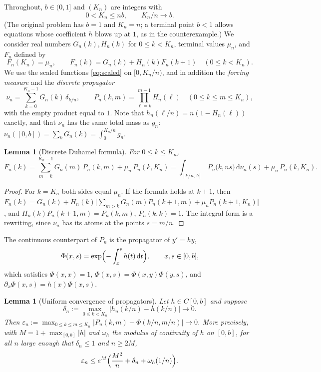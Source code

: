 \documentclass[11pt]{article}
\newtheorem{lemma}[theorem]{Lemma}
\theoremstyle{definition}
\theoremstyle{remark}
\newcommand{\dd}{\,\mathrm{d}}
\newcommand{\1}{\mathbf{1}}
\begin{document}
Throughout, $b\in(0,1]$ and $(K_n)$ are integers with
\begin{equation}\label{eq:Kn}
0<K_n\le nb,\qquad K_n/n\to b.
\end{equation}
(The original problem has $b=1$ and $K_n=n$; a terminal point $b<1$ allows equations whose
coefficient $h$ blows up at $1$, as in the counterexample.) We consider real numbers
$G_n(k),H_n(k)$ for $0\le k<K_n$, terminal values $\mu_n$, and $F_n$ defined by
\begin{equation}\label{eq:recK}
F_n(K_n)=\mu_n,\qquad F_n(k)=G_n(k)+H_n(k)F_n(k+1)\quad(0\le k<K_n).
\end{equation}
We use the scaled functions \eqref{eq:scaled} on $[0,K_n/n)$, and in addition the
\emph{forcing measure} and the \emph{discrete propagator}
\begin{equation}\label{eq:numeasure}
\nu_n=\sum_{k=0}^{K_n-1}G_n(k)\,\delta_{k/n},\qquad
P_n(k,m)=\prod_{\ell=k}^{m-1}H_n(\ell)\quad(0\le k\le m\le K_n),
\end{equation}
with the empty product equal to $1$. Note that $h_n(\ell/n)=n(1-H_n(\ell))$ exactly, and that
$\nu_n$ has the same total mass as $g_n$: $\nu_n([0,b])=\sum_k G_n(k)=\int_0^{K_n/n}g_n$.

\begin{lemma}[Discrete Duhamel formula]\label{lem:duhamel}
For $0\le k\le K_n$,
\[
F_n(k)=\sum_{m=k}^{K_n-1}G_n(m)\,P_n(k,m)+\mu_n\,P_n(k,K_n)
=\int_{[k/n,\,b]}P_n\bigl(k,ns\bigr)\dd\nu_n(s)+\mu_n\,P_n(k,K_n).
\]
\end{lemma}

\begin{proof}
For $k=K_n$ both sides equal $\mu_n$. If the formula holds at $k+1$, then
$F_n(k)=G_n(k)+H_n(k)\bigl[\sum_{m>k}G_n(m)P_n(k+1,m)+\mu_nP_n(k+1,K_n)\bigr]$, and
$H_n(k)P_n(k+1,m)=P_n(k,m)$, $P_n(k,k)=1$. The integral form is a rewriting, since $\nu_n$
has its atoms at the points $s=m/n$.
\end{proof}

The continuous counterpart of $P_n$ is the propagator of $y'=hy$,
\begin{equation}\label{eq:Phi}
\Phi(x,s)=\exp\Bigl(-\int_x^s h(t)\dd t\Bigr),\qquad x,s\in[0,b],
\end{equation}
which satisfies $\Phi(x,x)=1$, $\Phi(x,s)=\Phi(x,y)\Phi(y,s)$, and $\partial_x\Phi(x,s)=h(x)\Phi(x,s)$.

\begin{lemma}[Uniform convergence of propagators]\label{lem:prop}
Let $h\in C[0,b]$ and suppose
\begin{equation}\label{eq:A1}
\delta_n:=\max_{0\le k<K_n}\bigl|h_n(k/n)-h(k/n)\bigr|\longrightarrow0.
\end{equation}
Then $\varepsilon_n:=\max_{0\le k\le m\le K_n}\bigl|P_n(k,m)-\Phi(k/n,m/n)\bigr|\to0$.
More precisely, with $M=1+\max_{[0,b]}|h|$ and $\omega_h$ the modulus of continuity of $h$ on
$[0,b]$, for all $n$ large enough that $\delta_n\le1$ and $n\ge2M$,
\[
\varepsilon_n\le e^{M}\Bigl(\frac{M^2}{n}+\delta_n+\omega_h(1/n)\Bigr).
\]
\end{lemma}
\end{document}
